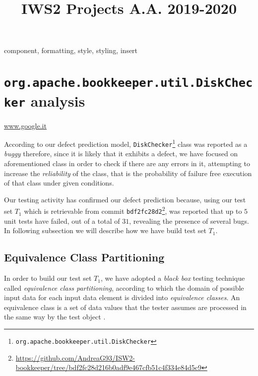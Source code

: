 \documentclass[conference, onecolumn]{IEEEtran}
\begin{document}
\title{IWS2 Projects A.A. 2019-2020}

\author{
}

\maketitle

\begin{IEEEkeywords}
component, formatting, style, styling, insert
\end{IEEEkeywords}




\section{\texttt{org.apache.bookkeeper.util.DiskChecker} analysis}

\url{www.google.it}

According to our defect prediction model, \texttt{DiskChecker}\footnote{\texttt{org.apache.bookkeeper.util.DiskChecker}} class was reported as a \textit{buggy} therefore, since it is likely that it exhibits a defect, we have focused on aforementioned class in order to check if there are any errors in it, attempting to increase the \textit{reliability} of the class, that is the probability of failure free execution of that class under given conditions.

Our testing activity has confirmed our defect prediction because, using our test set $T_1$ which is retrievable from commit \texttt{bdf2fc28d2}\footnote{\url{https://github.com/AndreaG93/ISW2-bookkeeper/tree/bdf2fc28d216b0adf9e467cfb51c4f334e84d5c9}}, was reported that up to $5$ unit tests have failed, out of a total of $31$, revealing the presence of several bugs. In following subsection we will describe how we have build test set $T_1$.

\subsection{Equivalence Class Partitioning}

In order to build our test set $T_1$, we have adopted a \textit{black box} testing technique called \textit{equivalence class partitioning}, according to which the domain of possible input data for each input data element is divided
into \textit{equivalence classes}. An equivalence class is a set of data values that the tester assumes are processed in the same way by the test object \cite{FoundationSoftwareTesting}.
\end{document}
